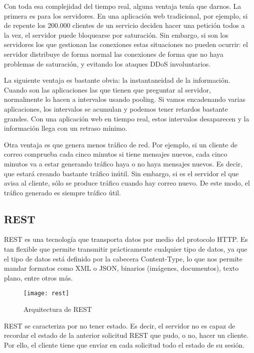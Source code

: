 Con toda esa complejidad del tiempo real, alguna ventaja tenía que darnos. La primera es para los servidores. En una aplicación web tradicional, por ejemplo, si de repente los 200.000 clientes de un servicio deciden hacer una petición todos a la vez, el servidor puede bloquearse por saturación. Sin embargo, si son los servidores los que gestionan las conexiones estas situaciones no pueden ocurrir: el servidor distribuye de forma normal las conexiones de forma que no haya problemas de saturación, y evitando los ataques DDoS involuntarios.

La siguiente ventaja es bastante obvia: la instantaneidad de la información. Cuando son las aplicaciones las que tienen que preguntar al servidor, normalmente lo hacen a intervalos usando pooling. Si vamos encadenando varias aplicaciones, los intervalos se acumulan y podemos tener retardos bastante grandes. Con una aplicación web en tiempo real, estos intervalos desaparecen y la información llega con un retraso mínimo.

Otra ventaja es que genera menos tráfico de red. Por ejemplo, si un cliente de correo comprueba cada cinco minutos si tiene mensajes nuevos, cada cinco minutos va a estar generando tráfico haya o no haya mensajes nuevos. Es decir, que estará creando bastante tráfico inútil. Sin embargo, si es el servidor el que avisa al cliente, sólo se produce tráfico cuando hay correo nuevo. De este modo, el tráfico generado es siempre tráfico útil.

\subsection{REST}

REST es una tecnología que transporta datos por medio del protocolo HTTP. Es tan flexible que permite transmitir prácticamente cualquier tipo de datos, ya que el tipo de datos está definido por la cabecera Content-Type, lo que nos permite mandar formatos como XML o JSON, binarios (imágenes, documentos), texto plano, entre otros más.

\begin{figure}[htp!]
  \centering
  \texttt{[image: rest]}
  \caption{Arquitectura de REST}
  \label{fig:rest}
\end{figure}

REST se caracteriza por no tener estado. Es decir, el servidor no es capaz de recordar el estado de la anterior solicitud REST que pudo, o no, hacer un cliente. Por ello, el cliente tiene que enviar en cada solicitud todo el estado de su sesión.

